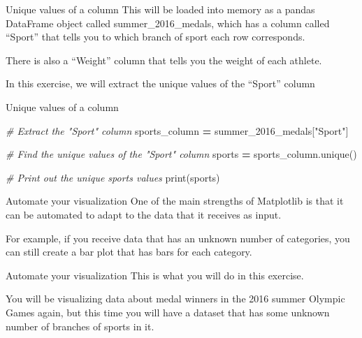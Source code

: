 \documentclass[
  ignorenonframetext,
]{beamer}
\newenvironment{Shaded}{\begin{snugshade}}{\end{snugshade}}
\newcommand{\BuiltInTok}[1]{#1}
\newcommand{\CommentTok}[1]{\textcolor[rgb]{0.56,0.35,0.01}{\textit{#1}}}
\newcommand{\NormalTok}[1]{#1}
\newcommand{\OperatorTok}[1]{\textcolor[rgb]{0.81,0.36,0.00}{\textbf{#1}}}
\newcommand{\StringTok}[1]{\textcolor[rgb]{0.31,0.60,0.02}{#1}}
\begin{document}
\begin{frame}{Unique values of a column}
\label{unique-values-of-a-column-2}
This will be loaded into memory as a pandas DataFrame object called
summer\_2016\_medals, which has a column called ``Sport'' that tells you
to which branch of sport each row corresponds.

There is also a ``Weight'' column that tells you the weight of each
athlete.

In this exercise, we will extract the unique values of the ``Sport''
column
\end{frame}

\begin{frame}[fragile]{Unique values of a column}
\label{unique-values-of-a-column-3}

\begin{Shaded}
\begin{Highlighting}[]
\CommentTok{\# Extract the "Sport" column}
\NormalTok{sports\_column }\OperatorTok{=}\NormalTok{ summer\_2016\_medals[}\StringTok{"Sport"}\NormalTok{]}

\CommentTok{\# Find the unique values of the "Sport" column}
\NormalTok{sports }\OperatorTok{=}\NormalTok{ sports\_column.unique()}

\CommentTok{\# Print out the unique sports values}
\BuiltInTok{print}\NormalTok{(sports)}
\end{Highlighting}
\end{Shaded}
\end{frame}

\begin{frame}{Automate your visualization}
\label{automate-your-visualization}
One of the main strengths of Matplotlib is that it can be automated to
adapt to the data that it receives as input.

For example, if you receive data that has an unknown number of
categories, you can still create a bar plot that has bars for each
category.
\end{frame}

\begin{frame}{Automate your visualization}
\label{automate-your-visualization-1}
This is what you will do in this exercise.

You will be visualizing data about medal winners in the 2016 summer
Olympic Games again, but this time you will have a dataset that has some
unknown number of branches of sports in it.
\end{frame}
\end{document}
